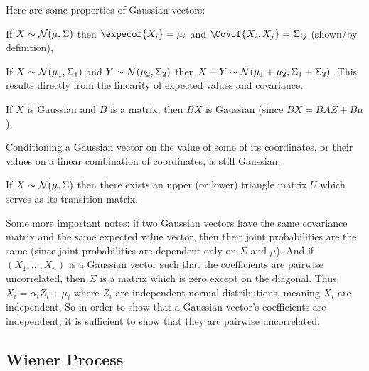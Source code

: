 Here are some properties of Gaussian vectors:
\benum
    \item If $X\sim{\cal N}(\mu,\Sigma)$ then $\expecof{X_i}=\mu_i$ and $\Covof{X_i,X_j}=\Sigma_{ij}$ (shown/by definition),
    \item If $X\sim{\cal N}(\mu_1,\Sigma_1)$ and $Y\sim{\cal N}(\mu_2,\Sigma_2)$ then $X+Y\sim{\cal N}(\mu_1+\mu_2,\Sigma_1+\Sigma_2)$.
        This results directly from the linearity of expected values and covariance.
    \item If $X$ is Gaussian and $B$ is a matrix, then $BX$ is Gaussian (since $BX=BAZ+B\mu$),
    \item Conditioning a Gaussian vector on the value of some of its coordinates, or their values on a linear combination of coordinates, is still Gaussian,
    \item If $X\sim{\cal N}(\mu,\Sigma)$ then there exists an upper (or lower) triangle matrix $U$ which serves as its transition matrix.
\eenum

Some more important notes: if two Gaussian vectors have the same covariance matrix and the same expected value vector, then their joint probabilities are the same (since joint probabilities are dependent
only on $\Sigma$ and $\mu$).
And if $(X_1,\dots,X_n)$ is a Gaussian vector such that the coefficients are pairwise uncorrelated, then $\Sigma$ is a matrix which is zero except on the diagonal.
Thus $X_i=\alpha_iZ_i+\mu_i$ where $Z_i$ are independent normal distributions, meaning $X_i$ are independent.
So in order to show that a Gaussian vector's coefficients are independent, it is sufficient to show that they are pairwise uncorrelated.

\subsection{Wiener Process}

